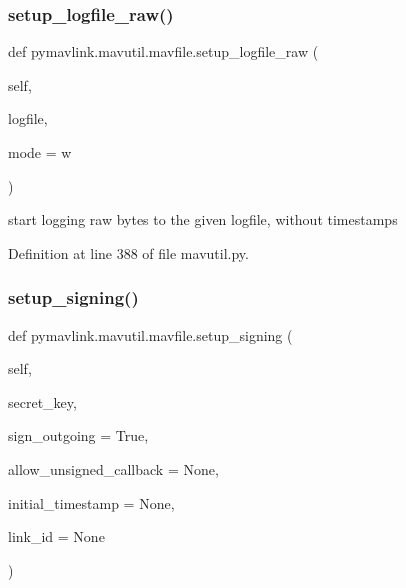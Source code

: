 \mbox{\label{classpymavlink_1_1mavutil_1_1mavfile_af8bde63a7c980d24fd1679dca36242bf}} 
\subsubsection{\texorpdfstring{setup\_logfile\_raw()}{setup\_logfile\_raw()}}
{\footnotesize\ttfamily def pymavlink.\+mavutil.\+mavfile.\+setup\+\_\+logfile\+\_\+raw (\begin{DoxyParamCaption}\item[{}]{self,  }\item[{}]{logfile,  }\item[{}]{mode = {\ttfamily \textquotesingle{}w\textquotesingle{}} }\end{DoxyParamCaption})}

\begin{DoxyVerb}start logging raw bytes to the given logfile, without timestamps\end{DoxyVerb}
 

Definition at line 388 of file mavutil.\+py.

\mbox{\label{classpymavlink_1_1mavutil_1_1mavfile_a0ba591be56a6a76483d5a7480512406b}} 
\subsubsection{\texorpdfstring{setup\_signing()}{setup\_signing()}}
{\footnotesize\ttfamily def pymavlink.\+mavutil.\+mavfile.\+setup\+\_\+signing (\begin{DoxyParamCaption}\item[{}]{self,  }\item[{}]{secret\+\_\+key,  }\item[{}]{sign\+\_\+outgoing = {\ttfamily True},  }\item[{}]{allow\+\_\+unsigned\+\_\+callback = {\ttfamily None},  }\item[{}]{initial\+\_\+timestamp = {\ttfamily None},  }\item[{}]{link\+\_\+id = {\ttfamily None} }\end{DoxyParamCaption})}


